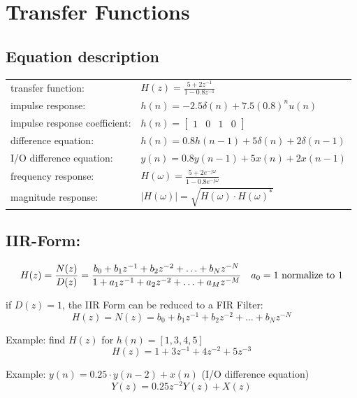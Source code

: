 \section{Transfer Functions}
\subsection{Equation description }
  \begin{tabular}{ll}
    transfer function: &
    $H(z) = \frac{5 + 2z^{-1}}{1-0.8z^{-1}}$ \\

    impulse response: &
    $h(n) = -2.5\delta(n) +7.5(0.8)^n u(n)$ \\
    impulse response coefficient: &
    $h(n) = [\begin{matrix} 1 & 0 & 1 & 0 \end{matrix} ]$ \\
    
    difference equation: &
    $h(n) = 0.8h(n-1) + 5\delta(n) + 2\delta(n-1)$ \\

    I/O difference equation: &
    $y(n) = 0.8y(n-1) + 5x(n) + 2x(n-1)$ \\
    
    frequency response: &
    $H(\omega) = \frac{5 + 2e^{-j\omega}}{1-0.8e^{-j\omega}}$ \\
    
    magnitude response: &
    $|H(\omega)| = \sqrt{H(\omega)\cdot H(\omega)^*}$
  \end{tabular}

\subsection{IIR-Form:}
\begin{align}
H(z) = \frac{N(z)}{D(z)}
		= \frac{b_0 + b_1 z^{-1} + b_2 z^{-2} + \ldots + b_N z^{-N}}{1 + a_1 z^{-1} + a_2 z^{-2} + \ldots + a_M z^{-M} } && a_0 = 1 \text{ normalize to } 1 \notag
\end{align}

if $D(z) = 1$, the IIR Form can be reduced to a FIR Filter:
\[
	H(z) = N(z) = b_0 + b_1 z^{-1} + b_2 z^{-2} + \ldots + b_N z^{-N}
\]

Example: find $H(z)$ for $h(n) = \left[1,3,4,5\right]$
\[ H(z) = 1 + 3z^{-1} + 4z^{-2} + 5z^{-3}\]

Example: $y(n) = 0.25 \cdot y(n-2) + x(n) $ \qquad (I/O difference equation)
\[
	Y(z) = 0.25z^{-2}Y(z) + X(z)
\]

